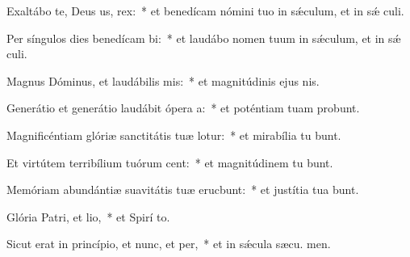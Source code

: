 \item Exaltábo te, Deus us, rex:~* et benedícam nómini tuo in sǽculum, et in sǽ culi.
\item Per síngulos dies benedícam bi:~* et laudábo nomen tuum in sǽculum, et in sǽ culi.
\item Magnus Dóminus, et laudábilis mis:~* et magnitúdinis ejus   nis.
\item Generátio et generátio laudábit ópera a:~* et poténtiam tuam probunt.
\item Magnificéntiam glóriæ sanctitátis tuæ lotur:~* et mirabília tu bunt.
\item Et virtútem terribílium tuórum cent:~* et magnitúdinem tu bunt.
\item Memóriam abundántiæ suavitátis tuæ erucbunt:~* et justítia tua bunt.
\item Glória Patri, et lio,~* et Spirí to.
\item Sicut erat in princípio, et nunc, et per,~* et in sǽcula sæcu. men.
